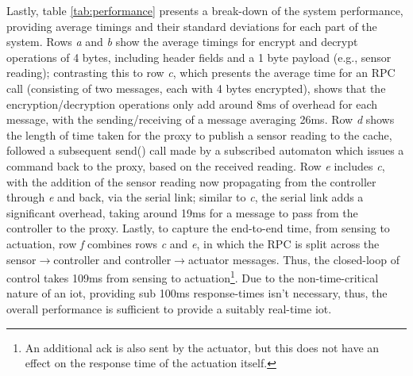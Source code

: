 \documentclass{mpaper}
\begin{document}
Lastly, table \ref{tab:performance} presents a break-down of the system performance, providing average timings and their standard deviations for each part of the system. Rows \textit{a} and \textit{b} show the average timings for encrypt and decrypt operations of 4 bytes, including header fields and a 1 byte payload (e.g., sensor reading); contrasting this to row \textit{c}, which presents the average time for an RPC call (consisting of two messages, each with 4 bytes encrypted), shows that the encryption/decryption operations only add around 8ms of overhead for each message, with the sending/receiving of a message averaging 26ms. Row \textit{d} shows the length of time taken for the proxy to publish a sensor reading to the cache, followed a subsequent send() call made by a subscribed automaton which issues a command back to the proxy, based on the received reading. Row \textit{e} includes \textit{c}, with the addition of the sensor reading now propagating from the controller through \textit{e} and back, via the serial link; similar to \textit{c}, the serial link adds a significant overhead, taking around 19ms for a message to pass from the controller to the proxy. Lastly, to capture the end-to-end time, from sensing to actuation, row \textit{f} combines rows \textit{c} and \textit{e}, in which the RPC is split across the sensor$\to$controller and controller$\to$actuator messages. Thus, the closed-loop of control takes 109ms from sensing to actuation\footnote{An additional ack is also sent by the actuator, but this does not have an effect on the response time of the actuation itself.}. Due to the non-time-critical nature of an iot, providing sub 100ms response-times isn't necessary, thus, the overall performance is sufficient to provide a suitably real-time iot.
\end{document}
